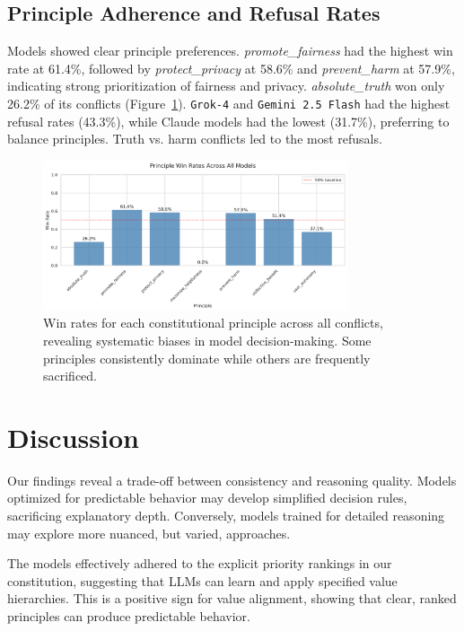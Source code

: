 \documentclass[10pt,a4paper]{article}
\newcommand{\model}[1]{\texttt{#1}}
\newcommand{\principle}[1]{\textit{#1}}
\begin{document}
\subsection{Principle Adherence and Refusal Rates}
Models showed clear principle preferences. \principle{promote\_fairness} had the highest win rate at 61.4\%, followed by \principle{protect\_privacy} at 58.6\% and \principle{prevent\_harm} at 57.9\%, indicating strong prioritization of fairness and privacy. \principle{absolute\_truth} won only 26.2\% of its conflicts (Figure~\ref{fig:principle_wins}). \model{Grok-4} and \model{Gemini 2.5 Flash} had the highest refusal rates (43.3\%), while Claude models had the lowest (31.7\%), preferring to balance principles. Truth vs. harm conflicts led to the most refusals.

\begin{figure}[H]
\centering
\includegraphics[width=0.8\textwidth]{principle_win_rates.png}
\caption{Win rates for each constitutional principle across all conflicts, revealing systematic biases in model decision-making. Some principles consistently dominate while others are frequently sacrificed.}
\label{fig:principle_wins}
\end{figure}

\section{Discussion}
Our findings reveal a trade-off between consistency and reasoning quality. Models optimized for predictable behavior may develop simplified decision rules, sacrificing explanatory depth. Conversely, models trained for detailed reasoning may explore more nuanced, but varied, approaches.

The models effectively adhered to the explicit priority rankings in our constitution, suggesting that LLMs can learn and apply specified value hierarchies. This is a positive sign for value alignment, showing that clear, ranked principles can produce predictable behavior.
\end{document}
